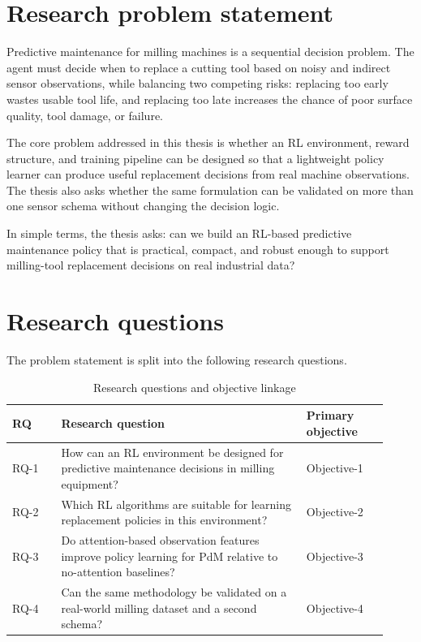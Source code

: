 \documentclass[12pt,oneside]{book}
\begin{document}
\section{Research problem statement}
Predictive maintenance for milling machines is a sequential decision problem. The agent must decide when to replace a cutting tool based on noisy and indirect sensor observations, while balancing two competing risks: replacing too early wastes usable tool life, and replacing too late increases the chance of poor surface quality, tool damage, or failure.

The core problem addressed in this thesis is whether an RL environment, reward structure, and training pipeline can be designed so that a lightweight policy learner can produce useful replacement decisions from real machine observations. The thesis also asks whether the same formulation can be validated on more than one sensor schema without changing the decision logic.

In simple terms, the thesis asks: can we build an RL-based predictive maintenance policy that is practical, compact, and robust enough to support milling-tool replacement decisions on real industrial data?

\section{Research questions}
The problem statement is split into the following research questions.

\begin{table}[htbp]
\centering
\caption{Research questions and objective linkage}
\label{tab:research-questions-objectives}
\begin{tabular}{L{0.12\linewidth} L{0.60\linewidth} L{0.20\linewidth}}
\toprule
\textbf{RQ} & \textbf{Research question} & \textbf{Primary objective} \\
\midrule
RQ-1 & How can an RL environment be designed for predictive maintenance decisions in milling equipment? & Objective-1 \\
RQ-2 & Which RL algorithms are suitable for learning replacement policies in this environment? & Objective-2 \\
RQ-3 & Do attention-based observation features improve policy learning for PdM relative to no-attention baselines? & Objective-3 \\
RQ-4 & Can the same methodology be validated on a real-world milling dataset and a second schema? & Objective-4 \\
\bottomrule
\end{tabular}
\end{table}
\end{document}
